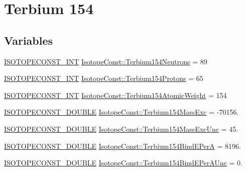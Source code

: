 \hypertarget{group___isotope_const-_terbium-_tb154}{}\section{Terbium 154}
\label{group___isotope_const-_terbium-_tb154}
\subsection*{Variables}
\begin{DoxyCompactItemize}
\item 
\mbox{\hyperlink{group___isotope_const-_macros_ga5f18360b3e99483a35c32d789e62621c}{I\+S\+O\+T\+O\+P\+E\+C\+O\+N\+S\+T\+\_\+\+I\+NT}} \mbox{\hyperlink{group___isotope_const-_terbium-_tb154_ga95e8080ce1c1d694ec6ab7bec28da287}{Isotope\+Const\+::\+Terbium154\+Neutrons}} = 89
\item 
\mbox{\hyperlink{group___isotope_const-_macros_ga5f18360b3e99483a35c32d789e62621c}{I\+S\+O\+T\+O\+P\+E\+C\+O\+N\+S\+T\+\_\+\+I\+NT}} \mbox{\hyperlink{group___isotope_const-_terbium-_tb154_gaec1ec86cfa469a090fa8da95d9a5ca71}{Isotope\+Const\+::\+Terbium154\+Protons}} = 65
\item 
\mbox{\hyperlink{group___isotope_const-_macros_ga5f18360b3e99483a35c32d789e62621c}{I\+S\+O\+T\+O\+P\+E\+C\+O\+N\+S\+T\+\_\+\+I\+NT}} \mbox{\hyperlink{group___isotope_const-_terbium-_tb154_gae7298fdbed0aa583efe601c91699064f}{Isotope\+Const\+::\+Terbium154\+Atomic\+Weight}} = 154
\item 
\mbox{\hyperlink{group___isotope_const-_macros_ga8f45a7272ce02c0b4c65c44636ed719a}{I\+S\+O\+T\+O\+P\+E\+C\+O\+N\+S\+T\+\_\+\+D\+O\+U\+B\+LE}} \mbox{\hyperlink{group___isotope_const-_terbium-_tb154_ga706a7f1e35d063d5cc6e420d3826aff6}{Isotope\+Const\+::\+Terbium154\+Mass\+Exc}} = -\/70156.
\item 
\mbox{\hyperlink{group___isotope_const-_macros_ga8f45a7272ce02c0b4c65c44636ed719a}{I\+S\+O\+T\+O\+P\+E\+C\+O\+N\+S\+T\+\_\+\+D\+O\+U\+B\+LE}} \mbox{\hyperlink{group___isotope_const-_terbium-_tb154_ga307cfd8f6385237388a068fda88d26ca}{Isotope\+Const\+::\+Terbium154\+Mass\+Exc\+Unc}} = 45.
\item 
\mbox{\hyperlink{group___isotope_const-_macros_ga8f45a7272ce02c0b4c65c44636ed719a}{I\+S\+O\+T\+O\+P\+E\+C\+O\+N\+S\+T\+\_\+\+D\+O\+U\+B\+LE}} \mbox{\hyperlink{group___isotope_const-_terbium-_tb154_ga0eb9e20b5715996d6e590899d3582313}{Isotope\+Const\+::\+Terbium154\+Bind\+E\+PerA}} = 8196.
\item 
\mbox{\hyperlink{group___isotope_const-_macros_ga8f45a7272ce02c0b4c65c44636ed719a}{I\+S\+O\+T\+O\+P\+E\+C\+O\+N\+S\+T\+\_\+\+D\+O\+U\+B\+LE}} \mbox{\hyperlink{group___isotope_const-_terbium-_tb154_ga07996f34b817934b44a2309e24478356}{Isotope\+Const\+::\+Terbium154\+Bind\+E\+Per\+A\+Unc}} = 0.

\end{DoxyCompactItemize}
